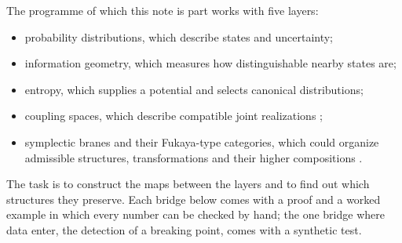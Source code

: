 \documentclass[11pt]{article}
\theoremstyle{definition}
\theoremstyle{remark}
\begin{document}
The programme of which this note is part works with five layers:
\begin{itemize}[leftmargin=*,nosep]
\item probability distributions, which describe states and uncertainty;
\item information geometry, which measures how distinguishable nearby states are;
\item entropy, which supplies a potential and selects canonical distributions;
\item coupling spaces, which describe compatible joint realizations \cite{Conditionals,Algebras};
\item symplectic branes and their Fukaya-type categories, which could organize admissible structures, transformations and
  their higher compositions \cite[\S\S7, 10]{Conditionals}.
\end{itemize}
The task is to construct the maps between the layers and to find out which structures they preserve. Each bridge below
comes with a proof and a worked example in which every number can be checked by hand; the one bridge where data enter, the
detection of a breaking point, comes with a synthetic test.
\end{document}
